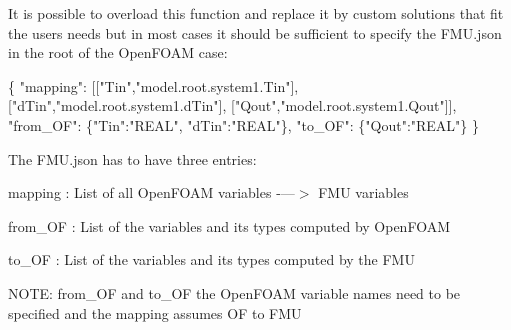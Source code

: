 It is possible to overload this function and replace it by custom solutions that fit the user\textquotesingle{}s needs but in most cases it should be sufficient to specify the F\+M\+U.\+json in the root of the Open\+F\+O\+AM case\+:


\begin{DoxyCode}
\{
    "mapping": [["Tin","model.root.system1.Tin"],
                ["dTin","model.root.system1.dTin"],
                ["Qout","model.root.system1.Qout"]],
    "from\_OF": \{"Tin":"REAL",
                "dTin":"REAL"\},
    "to\_OF":   \{"Qout":"REAL"\}
\}
\end{DoxyCode}


The F\+M\+U.\+json has to have three entries\+:


\begin{DoxyItemize}
\item mapping \+: List of all Open\+F\+O\+AM variables -\/---$>$ F\+MU variables
\item from\+\_\+\+OF \+: List of the variables and its types computed by Open\+F\+O\+AM
\item to\+\_\+\+OF \+: List of the variables and its types computed by the F\+MU
\end{DoxyItemize}

N\+O\+TE\+: from\+\_\+\+OF and to\+\_\+\+OF the Open\+F\+O\+AM variable names need to be specified and the mapping assumes OF to F\+MU 